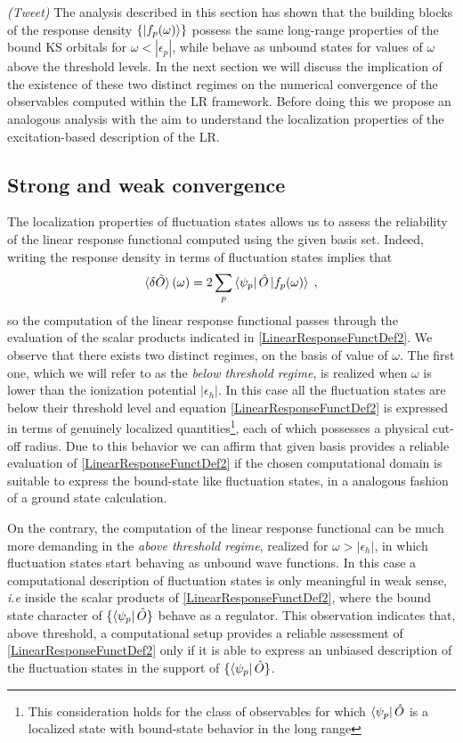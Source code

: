 \documentclass[reprint,aps,prb]{revtex4-1}
\newcommand{\eps}{\epsilon}
\newcommand{\be}{\begin{equation}}
\newcommand{\ee}{\end{equation}}
\newcommand{\lb}{\label}
\newcommand{\op}[1]{\hat {#1}}
\begin{document}
\emph{(Tweet)} The analysis described in this section has shown that the building blocks of the response density $\{\ket{f_p(\omega)}\}$ possess the same long-range properties of the bound KS
orbitals for $\omega < |\eps_p|$, while behave as unbound states for values of $\omega$ above the threshold levels. In the next section we will discuss the implication of the existence of these
two distinct regimes on the numerical convergence of the observables computed within the LR framework. Before doing this we propose an analogous analysis with the aim to understand the localization 
properties of the excitation-based description of the LR.

\subsection{Strong and weak convergence}

The localization properties of fluctuation states allows us to assess the reliability of the linear response functional computed using the given basis set. Indeed, writing the response 
density in terms of fluctuation states implies that 
\be\lb{LinearResponseFunctDef2}
\braket{\delta\op O}(\omega) = 2\sum_p \bra{\psi_p}\op O\ket{f_p(\omega)} \;,
\ee
so the computation of the linear response functional passes through the evaluation of the scalar products indicated in \eqref{LinearResponseFunctDef2}. We observe that there exists two 
distinct regimes, on the basis of value of $\omega$. The first one, which we will refer to as the \emph{below threshold regime}, is realized when $\omega$ is lower than the ionization 
potential $|\eps_h|$. In this case all the fluctuation states are below their threshold level and equation \eqref{LinearResponseFunctDef2} is expressed in terms of genuinely localized 
quantities\footnote{This consideration holds for the class of observables for which $\bra{\psi_p}\op O$ is a localized state  with bound-state behavior in the long range}, each of which 
possesses a physical cut-off radius. Due to this behavior we can affirm that given basis provides a reliable evaluation of \eqref{LinearResponseFunctDef2} if the chosen computational domain 
is suitable to express the bound-state like fluctuation states, in a analogous fashion of a ground state calculation. 

On the contrary, the computation of the linear response functional can be much more demanding in the \emph{above threshold regime}, realized for $\omega>|\eps_h|$, in which fluctuation 
states start behaving as unbound wave functions. In this case a computational description of fluctuation states is only meaningful in weak sense, \emph{i.e} inside the scalar products of 
\eqref{LinearResponseFunctDef2}, where the bound state character of $\{\bra{\psi_p}\op O\}$ behave as a regulator. This observation indicates that, above threshold, a computational setup 
provides a reliable assessment of \eqref{LinearResponseFunctDef2} only if it is able to express an unbiased description of the fluctuation states in the support of $\{\bra{\psi_p}\op O\}$. 
\end{document}

